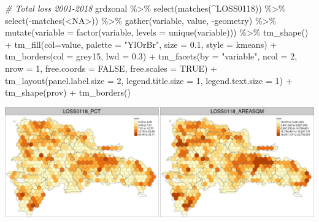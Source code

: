\documentclass[10pt,landscape,a3paper]{article}
\newenvironment{Shaded}{\begin{snugshade}}{\end{snugshade}}
\newcommand{\AttributeTok}[1]{\textcolor[rgb]{0.77,0.63,0.00}{#1}}
\newcommand{\CommentTok}[1]{\textcolor[rgb]{0.56,0.35,0.01}{\textit{#1}}}
\newcommand{\ConstantTok}[1]{\textcolor[rgb]{0.00,0.00,0.00}{#1}}
\newcommand{\DecValTok}[1]{\textcolor[rgb]{0.00,0.00,0.81}{#1}}
\newcommand{\FloatTok}[1]{\textcolor[rgb]{0.00,0.00,0.81}{#1}}
\newcommand{\FunctionTok}[1]{\textcolor[rgb]{0.00,0.00,0.00}{#1}}
\newcommand{\NormalTok}[1]{#1}
\newcommand{\SpecialCharTok}[1]{\textcolor[rgb]{0.00,0.00,0.00}{#1}}
\newcommand{\StringTok}[1]{\textcolor[rgb]{0.31,0.60,0.02}{#1}}
\begin{document}
\begin{Shaded}
\begin{Highlighting}[]

\CommentTok{\# Total loss 2001{-}2018}
\NormalTok{grdzonal }\SpecialCharTok{\%\textgreater{}\%} \FunctionTok{select}\NormalTok{(}\FunctionTok{matches}\NormalTok{(}\StringTok{\textquotesingle{}\^{}LOSS0118\textquotesingle{}}\NormalTok{)) }\SpecialCharTok{\%\textgreater{}\%} \FunctionTok{select}\NormalTok{(}\SpecialCharTok{{-}}\FunctionTok{matches}\NormalTok{(}\StringTok{\textquotesingle{}\textless{}NA\textgreater{}\textquotesingle{}}\NormalTok{)) }\SpecialCharTok{\%\textgreater{}\%} 
  \FunctionTok{gather}\NormalTok{(variable, value, }\SpecialCharTok{{-}}\NormalTok{geometry) }\SpecialCharTok{\%\textgreater{}\%}
  \FunctionTok{mutate}\NormalTok{(}\AttributeTok{variable =} \FunctionTok{factor}\NormalTok{(variable, }\AttributeTok{levels =} \FunctionTok{unique}\NormalTok{(variable))) }\SpecialCharTok{\%\textgreater{}\%} 
  \FunctionTok{tm\_shape}\NormalTok{() }\SpecialCharTok{+}
  \FunctionTok{tm\_fill}\NormalTok{(}\AttributeTok{col=}\StringTok{\textquotesingle{}value\textquotesingle{}}\NormalTok{, }\AttributeTok{palette =} \StringTok{"YlOrBr"}\NormalTok{, }\AttributeTok{size =} \FloatTok{0.1}\NormalTok{, }\AttributeTok{style =} \StringTok{\textquotesingle{}kmeans\textquotesingle{}}\NormalTok{) }\SpecialCharTok{+}
  \FunctionTok{tm\_borders}\NormalTok{(}\AttributeTok{col =} \StringTok{\textquotesingle{}grey15\textquotesingle{}}\NormalTok{, }\AttributeTok{lwd =} \FloatTok{0.3}\NormalTok{) }\SpecialCharTok{+}
  \FunctionTok{tm\_facets}\NormalTok{(}\AttributeTok{by =} \StringTok{"variable"}\NormalTok{, }\AttributeTok{ncol =} \DecValTok{2}\NormalTok{, }\AttributeTok{nrow =} \DecValTok{1}\NormalTok{, }\AttributeTok{free.coords =} \ConstantTok{FALSE}\NormalTok{, }\AttributeTok{free.scales =} \ConstantTok{TRUE}\NormalTok{) }\SpecialCharTok{+}
  \FunctionTok{tm\_layout}\NormalTok{(}\AttributeTok{panel.label.size =} \DecValTok{2}\NormalTok{, }\AttributeTok{legend.title.size =} \DecValTok{1}\NormalTok{, }\AttributeTok{legend.text.size =} \DecValTok{1}\NormalTok{) }\SpecialCharTok{+}
  \FunctionTok{tm\_shape}\NormalTok{(prov) }\SpecialCharTok{+} \FunctionTok{tm\_borders}\NormalTok{()}
\end{Highlighting}
\end{Shaded}

\begin{center}\includegraphics{img/data-download-preparation-eda/zonal-long-term-grid-7} \end{center}
\end{document}
